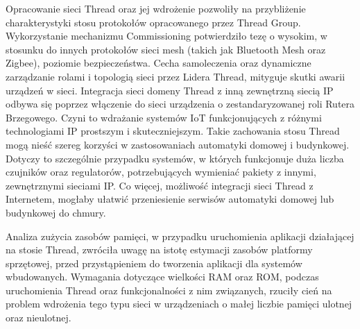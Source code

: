 Opracowanie sieci Thread oraz jej wdrożenie pozwoliły na przybliżenie charakterystyki stosu protokołów opracowanego przez Thread Group. Wykorzystanie mechanizmu Commissioning potwierdziło tezę o wysokim, w stosunku do innych protokołów sieci mesh (takich jak Bluetooth Mesh oraz Zigbee), poziomie bezpieczeństwa. Cecha samoleczenia oraz dynamiczne zarządzanie rolami i topologią sieci przez Lidera Thread, mityguje skutki awarii urządzeń w sieci. Integracja sieci domeny Thread z inną zewnętrzną siecią IP odbywa się poprzez włączenie do sieci urządzenia o zestandaryzowanej roli Rutera Brzegowego. Czyni to wdrażanie systemów IoT funkcjonujących z różnymi technologiami IP prostszym i skuteczniejszym. Takie zachowania stosu Thread mogą nieść szereg korzyści w zastosowaniach automatyki domowej i budynkowej. Dotyczy to szczególnie przypadku systemów, w których funkcjonuje duża liczba czujników oraz regulatorów, potrzebujących wymieniać pakiety z innymi, zewnętrznymi sieciami IP. Co więcej, możliwość integracji sieci Thread z Internetem, mogłaby ułatwić przeniesienie serwisów automatyki domowej lub budynkowej do chmury.

Analiza zużycia zasobów pamięci, w przypadku uruchomienia aplikacji działającej na stosie Thread, zwróciła uwagę na istotę estymacji zasobów platformy sprzętowej, przed przystąpieniem do tworzenia aplikacji dla systemów wbudowanych. Wymagania dotyczące wielkości RAM oraz ROM, podczas uruchomienia Thread oraz funkcjonalności z nim związanych, rzuciły cień na problem wdrożenia tego typu sieci w urządzeniach o małej liczbie pamięci ulotnej oraz nieulotnej.